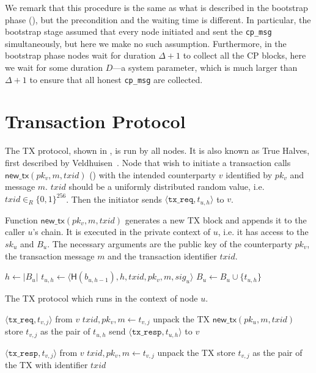 We remark that this procedure is the same as what is described in the bootstrap phase (),
but the precondition and the waiting time is different.
In particular, the bootstrap stage assumed that every node initiated and sent the \texttt{cp\_msg} simultaneously,
but here we make no such assumption.
Furthermore, in the bootstrap phase nodes wait for duration $\Delta + 1$ to collect all the CP blocks,
here we wait for some duration $D$---a system parameter,
which is much larger than $\Delta + 1$ to ensure that all honest \texttt{cp\_msg} are collected.


\section{Transaction Protocol}
\label{sec:tx-protocol}

The TX protocol, shown in , is run by all nodes.
It is also known as True Halves, first described by Veldhuisen~\cite[Chapter~3.2]{truehalves}.
Node that wish to initiate a transaction calls $\textsf{new\_tx}(pk_v, m, txid)$ () with the intended counterparty $v$ identified by $pk_v$ and message $m$.
$txid$ should be a uniformly distributed random value, i.e. $txid \in_R \{0, 1\}^{256}$.
Then the initiator sends $\langle \texttt{tx\_req}, t_{u, h}\rangle$ to $v$.

\begin{algorithm}
    \caption{Function $\textsf{new\_tx}(pk_v, m, txid)$ generates a new TX block and appends it to the caller $u$'s chain.
    It is executed in the private context of $u$, i.e. it has access to the $sk_u$ and $B_u$.
    The necessary arguments are the public key of the counterparty $pk_v$, the transaction message $m$ and the transaction identifier $txid$.}
    \label{alg:new-tx}

    \begin{algorithmic}
    \State $h \gets |B_u|$
    \State $t_{u, h} \gets \langle \textsf{H}(b_{u, h - 1}), h, txid, pk_v, m, sig_u \rangle$
    \State $B_u \gets B_u \cup \{ t_{u, h} \}$
    \end{algorithmic}
\end{algorithm}

\begin{algorithm}
    \caption{The TX protocol which runs in the context of node $u$.}
    \label{alg:tx-proto}

    \begin{algorithmic}
        \Upon $\langle \texttt{tx\_req}, t_{v, j} \rangle$ from $v$
        \State $txid, pk_v, m \gets t_{v, j}$ \Comment unpack the TX
        \State $\textsf{new\_tx}(pk_u, m, txid)$
        \State store $t_{v, j}$ as the pair of $t_{u, h}$
        \State send $\langle \texttt{tx\_resp}, t_{u, h} \rangle$ to $v$

        \Upon $\langle \texttt{tx\_resp}, t_{v, j} \rangle$ from $v$
        \State $txid, pk_v, m \gets t_{v, j}$ \Comment unpack the TX
        \State store $t_{v, j}$ as the pair of the TX with identifier $txid$
    \end{algorithmic}
\end{algorithm}

